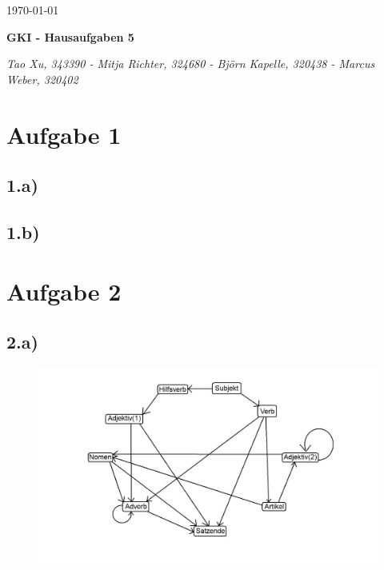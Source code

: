 \documentclass[a4paper]{article}
\begin{document}
  \begin{flushright}
    \today
  \end{flushright}
  \begin{center}
    \Large\textbf{{GKI - Hausaufgaben 5}}\\
  \end{center}

  \begin{center}
        \large\textsl{Tao Xu, 343390 - Mitja Richter, 324680 - Björn Kapelle, 320438 - Marcus Weber, 320402}\\
  \end{center}
  
\section*{Aufgabe 1}

\subsection*{1.a)}

\subsection*{1.b)}

\section*{Aufgabe 2}

\subsection*{2.a)}
\begin{figure}[!htbp]
\centering
\includegraphics[width = 1\columnwidth]{blatt6aufgabe2a}
\end{figure}
\end{document}
